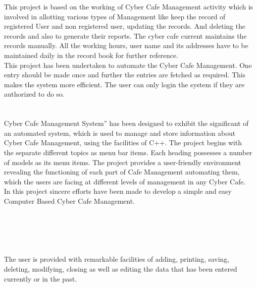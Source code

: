 \documentclass[12pt]{article}
\begin{document}
This project is based on the working of Cyber Cafe Management activity which is
involved in allotting various types of Management like keep the record of registered
User and non registered user, updating the records. And deleting the records and
also to generate their reports. The cyber cafe current maintains the records manually.
All the working hours, user name and its addresses have to be maintained daily in
the record book for further reference.
\\ 
This project has been undertaken to automate the Cyber Cafe Management. One
entry should be made once and further the entries are fetched as required. This
makes the system more efficient. The user can only login the system if they are
authorized to do so.   \\
\\ \\
Cyber Cafe Management System” has been designed to exhibit the significant of an
automated system, which is used to manage and store information about Cyber Cafe
Management, using the facilities of C++.
The project begins with the separate different topics as menu bar items. Each
heading possesses a number of models as its menu items. The project provides a
user-friendly environment revealing the functioning of each part of Cafe Management
automating them, which the users are facing at different levels of management in any
Cyber Cafe. In this project sincere efforts have been made to develop a simple and
easy Computer Based Cyber Cafe Management. \\


\\
\\ \\ \\ \\
The user is provided with remarkable facilities of adding, printing, saving, deleting,
modifying, closing as well as editing the data that has been entered currently or in
the past. 



\clearpage
\tableofcontents
\newpage
\clearpage
\end{document}
